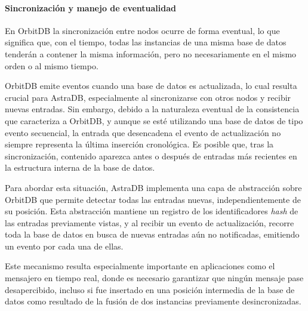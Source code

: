 \paragraph{Sincronización y manejo de eventualidad}

En OrbitDB la sincronización entre nodos ocurre de forma eventual, lo que significa que, con el tiempo, todas las instancias de una misma base de datos tenderán a contener la misma información, pero no necesariamente en el mismo orden o al mismo tiempo.

OrbitDB emite eventos cuando una base de datos es actualizada, lo cual resulta crucial para AstraDB, especialmente al sincronizarse con otros nodos y recibir nuevas entradas. Sin embargo, debido a la naturaleza eventual de la consistencia que caracteriza a OrbitDB, y aunque se esté utilizando una base de datos de tipo evento secuencial, la entrada que desencadena el evento de actualización no siempre representa la última inserción cronológica. Es posible que, tras la sincronización, contenido aparezca antes o después de entradas más recientes en la estructura interna de la base de datos.

Para abordar esta situación, AstraDB implementa una capa de abstracción sobre OrbitDB que permite detectar todas las entradas nuevas, independientemente de su posición. Esta abstracción mantiene un registro de los identificadores \textit{hash} de las entradas previamente vistas, y al recibir un evento de actualización, recorre toda la base de datos en busca de nuevas entradas aún no notificadas, emitiendo un evento por cada una de ellas.

Este mecanismo resulta especialmente importante en aplicaciones como el mensajero en tiempo real, donde es necesario garantizar que ningún mensaje pase desapercibido, incluso si fue insertado en una posición intermedia de la base de datos como resultado de la fusión de dos instancias previamente desincronizadas.

